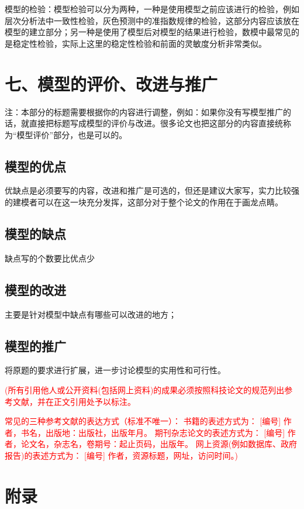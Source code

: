 \documentclass{my_paper}
\begin{document}
模型的检验：模型检验可以分为两种，一种是使用模型之前应该进行的检验，例如层次分析法中一致性检验，灰色预测中的准指数规律的检验，这部分内容应该放在模型的建立部分；另一种是使用了模型后对模型的结果进行检验，数模中最常见的是稳定性检验，实际上这里的稳定性检验和前面的灵敏度分析非常类似。

\section{七、模型的评价、改进与推广}
注：本部分的标题需要根据你的内容进行调整，例如：如果你没有写模型推广的话，就直接把标题写成模型的评价与改进。很多论文也把这部分的内容直接统称为“模型评价”部分，也是可以的。

\subsection{模型的优点}
优缺点是必须要写的内容，改进和推广是可选的，但还是建议大家写，实力比较强的建模者可以在这一块充分发挥，这部分对于整个论文的作用在于画龙点睛。
\subsection{模型的缺点}
缺点写的个数要比优点少
\subsection{模型的改进}
主要是针对模型中缺点有哪些可以改进的地方\cite{risken1996fokker}；
\subsection{模型的推广}
将原题的要求进行扩展\cite{rossler1979equation}，进一步讨论模型的实用性和可行性\cite{mckean1970nagumo}。

\begin{center}
\end{center}
\textcolor{red}{(所有引用他人或公开资料(包括网上资料)的成果必须按照科技论文的规范列出参考文献，并在正文引用处予以标注。}

\textcolor{red}{常见的三种参考文献的表达方式（标准不唯一）：
书籍的表述方式为： [编号] 作者，书名，出版地：出版社，出版年月。
期刊杂志论文的表述方式为： [编号] 作者，论文名，杂志名，卷期号：起止页码，出版年。
网上资源(例如数据库、政府报告)的表述方式为： [编号] 作者，资源标题，网址，访问时间。)}
\newpage
\section{附录}
\end{document}

